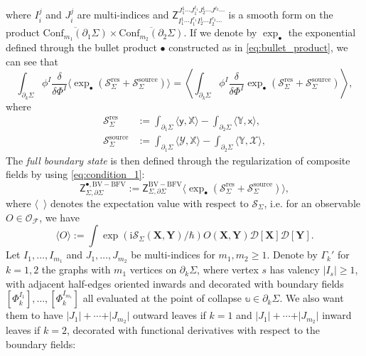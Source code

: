 \documentclass[11pt,colorinlistoftodos]{amsart}
\numberwithin{equation}{subsection}
\theoremstyle{plain}
\theoremstyle{definition}
\theoremstyle{remark}
\newcommand{\de}{\partial}
\newcommand{\calS}{\mathcal{S}}
\newcommand{\calO}{\mathcal{O}}
\newcommand{\calF}{\mathcal{F}}
\newcommand{\I}{\mathrm{i}}
\begin{document}
where $I^j_i$ and $J^j_i$ are multi-indices and $\mathsf{Z}^{J_1^1\dotsm J_1^{\ell_1}J_2^1\dotsm J^{\ell_2}\dotsm}_{I_1^1\dotsm I_1^{r_1}I_2^{1}\dotsm I_2^{r_2}\dotsm}$ is a smooth form on the product $\overline{\mathrm{Conf}_{m_1}(\de_1\Sigma)}\times\overline{\mathrm{Conf}_{m_2}(\de_2\Sigma)}$. If we denote by $\exp_\bullet$ the exponential defined through the bullet product $\bullet$ constructed as in \eqref{eq:bullet_product}, we can see that 
\[
\int_{\de_k\Sigma}\phi^I\frac{\delta}{\delta\Phi^I}\Big\langle\exp_\bullet\left(\calS^\mathrm{res}_\Sigma+\calS^\mathrm{source}_\Sigma\right)\Big\rangle=\left\langle\int_{\de_k\Sigma}\phi^I\frac{\delta}{\delta\Phi^I}\exp_\bullet\left(\calS^\mathrm{res}_\Sigma+\calS^\mathrm{source}_\Sigma\right)\right\rangle,
\]
where 
\begin{align*}
    \calS^\mathrm{res}_\Sigma&:=\int_{\de_1\Sigma}\langle \mathsf{y},\mathds{X}\rangle-\int_{\de_2\Sigma}\langle\mathds{Y},\mathsf{x}\rangle,\\
    \calS^\mathrm{source}_\Sigma&:=\int_{\de_1\Sigma}\langle\mathscr{Y},\mathds{X}\rangle-\int_{\de_2\Sigma}\langle \mathds{Y},\mathscr{X}\rangle,
\end{align*}
The \emph{full boundary state} is then defined through the regularization of composite fields by using \eqref{eq:condition_1}:
\begin{equation}
    \label{eq:full_state}
    \mathsf{Z}^{\bullet,\scriptscriptstyle\mathrm{BV-BFV}}_{\Sigma,\de\Sigma}:=\mathsf{Z}^{\scriptscriptstyle\mathrm{BV-BFV}}_{\Sigma,\de\Sigma}\Big\langle\exp_\bullet\left(\calS^\mathrm{res}_\Sigma+\calS^\mathrm{source}_\Sigma\right)\Big\rangle,
\end{equation}
where $\big\langle\enspace\big\rangle$ denotes the expectation value with respect to $\calS_\Sigma$, i.e. for an observable $O\in\calO_\calF$, we have
\[
\big\langle O\big\rangle:=\int\exp(\I\calS_\Sigma(\mathbf{X},\mathbf{Y})/\hbar)O(\mathbf{X},\mathbf{Y})\mathscr{D}[\mathbf{X}]\mathscr{D}[\mathbf{Y}].
\]
Let $I_1,\ldots, I_{m_1}$ and $J_1,\ldots,J_{m_2}$ be multi-indices for $m_1,m_2\geq 1$.
Denote by $\Gamma_k'$ for $k=1,2$ the graphs with $m_1$ vertices on $\de_k\Sigma$, where vertex $s$ has valency $\vert I_s\vert\geq 1$, with adjacent half-edges oriented inwards and decorated with boundary fields $\left[\Phi^{I_1}_k\right],\ldots,\left[\Phi^{I_{m_1}}_k\right]$ all evaluated at the point of collapse $\mathbb{u}\in \de_k\Sigma$. We also want them to have $\vert J_1\vert+\dotsm +\vert J_{m_2}\vert$ outward leaves if $k=1$ and $\vert J_1\vert+\dotsm+\vert J_{m_2}\vert$ inward leaves if $k=2$, decorated with functional derivatives with respect to the boundary fields:
\end{document}
